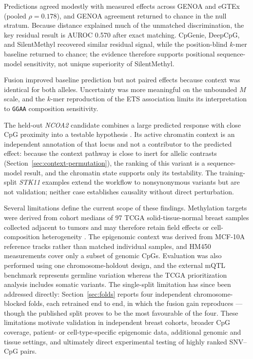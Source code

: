 \documentclass[10pt,letterpaper,twocolumn]{article}
\begin{document}
{\color{addedred}
Predictions agreed modestly with measured effects across GENOA and eGTEx
(pooled $\rho=0.178$), and GENOA agreement returned to chance in the null
stratum. Because distance explained much of the unmatched discrimination, the
key residual result is AUROC 0.570 after exact matching. CpGenie, DeepCpG, and
SilentMethyl recovered similar residual signal, while the position-blind
$k$-mer baseline returned to chance; the evidence therefore supports positional
sequence-model sensitivity, not unique superiority of SilentMethyl.

Fusion improved baseline prediction but not paired effects because context was
identical for both alleles. Uncertainty was more meaningful on the unbounded
$M$ scale, and the $k$-mer reproduction of the ETS association limits its
interpretation to \texttt{GGAA} composition sensitivity.
}

{\color{addedred}
The held-out \textit{NCOA2} candidate combines a large predicted response with
close CpG proximity into a testable hypothesis \cite{cai2019ncoa2}. Its active
chromatin context is an independent annotation of that locus and not a
contributor to the predicted effect: because the context pathway is close to
inert for allelic contrasts (Section~\ref{sec:context-permutation}), the
ranking of this variant is a sequence-model result, and the chromatin state
supports only its testability.
The training-split \textit{STK11} examples extend the workflow to nonsynonymous
variants but are not validation; neither case establishes causality without
direct perturbation.
}

Several limitations define the current scope of these findings. Methylation targets were derived from cohort medians of 97 TCGA solid-tissue-normal breast samples collected adjacent to tumors and may therefore retain field effects or cell-composition heterogeneity \cite{tcga2012breast,teschendorff2016field}. The epigenomic context was derived from MCF-10A reference tracks rather than matched individual samples, and HM450 measurements cover only a subset of genomic CpGs. Evaluation was also performed using one chromosome-holdout design, and the external mQTL benchmark represents germline variation whereas the TCGA prioritization analysis includes somatic variants. {\color{addedred}The single-split limitation has since been addressed directly: Section~\ref{sec:folds} reports four independent chromosome-blocked folds, each retrained end to end, in which the fusion gain reproduces --- though the published split proves to be the most favourable of the four.} These limitations motivate validation in independent breast cohorts, broader CpG coverage, patient- or cell-type-specific epigenomic data, additional genomic and tissue settings, and ultimately direct experimental testing of highly ranked SNV--CpG pairs.
\end{document}
